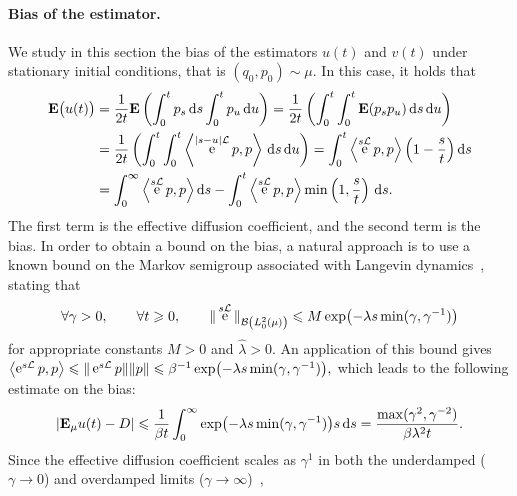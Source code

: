 \documentclass[11pt,a4paper]{article}
\DeclareMathOperator{\e}{e}
\newcommand{\expect}[0]{\mathbf{E}}
\renewcommand{\d}{\mathrm d}
\theoremstyle{plain}
\numberwithin{equation}{section}
\renewcommand{\leq}{\leqslant}
\renewcommand{\geq}{\geqslant}
\begin{document}
\paragraph{Bias of the estimator.}%
We study in this section the bias of the estimators $u(t)$ and $v(t)$ under stationary initial conditions,
that is $(q_0, p_0) \sim \mu$.
In this case, it holds that
\begin{equation}
\label{eq:bias_without_control}
\begin{aligned}
    \expect \bigl(u(t)\bigr)
    &= \frac{1}{2t} \expect \left( \int_{0}^{t} p_s \, \d s \int_{0}^{t} p_u \, \d u \right)
    = \frac{1}{2t} \left( \int_{0}^{t} \int_{0}^{t} \expect (p_s p_u) \, \d s \, \d u \right) \\
    &= \frac{1}{2t} \left( \int_{0}^{t} \int_{0}^{t} \ip{\e^{\abs{s - u} \mathcal L}p}{p} \, \d s \, \d u \right)
    =  \int_{0}^{t} \ip{\e^{s \mathcal L}p}{p} \left(1 - \frac{s}{t}\right) \d s  \\
    &= \int_{0}^{\infty} \ip{\e^{s \mathcal L}p}{p}  \d s - \int_{0}^{t} \ip{\e^{s \mathcal L}p}{p} \min\left(1, \frac{s}{t}\right) \, \d s.
\end{aligned}
\end{equation}
The first term is the effective diffusion coefficient,
and the second term is the bias.
In order to obtain a bound on the bias,
a natural approach is to use a known bound on the Markov semigroup associated with Langevin dynamics~\cite{roussel2018spectral},
stating that
\begin{equation}
    \label{eq:decay_semigroup_general}
    \forall \gamma > 0, \qquad \forall t \geq 0, \qquad
    \norm*{ \e^{s \mathcal L} }[\mathcal B \left(L^2_0\left(\mu\right) \right)] \leq M \exp \bigl(- \lambda s \min(\gamma, \gamma^{-1}) \bigr)
\end{equation}
for appropriate constants $M > 0$ and $\hat \lambda > 0$.
An application of this bound gives
\(
    \ip{\e^{s \mathcal L}p}{p} \leq \norm*{\e^{s \mathcal L}p} \norm*{p} \leq \beta^{-1} \exp\bigl(- \lambda s \min(\gamma, \gamma^{-1})\bigr),
\)
which leads to the following estimate on the bias:
\begin{equation}
    \label{eq:bias}
    \abs{\expect_{\mu} u(t) - D}
    \leq \frac{1}{\beta t}\int_{0}^{\infty} \exp\bigl(- \lambda s \min(\gamma, \gamma^{-1})\bigr) s \, \d s
    = \frac{\max (\gamma^2, \gamma^{-2})}{\beta \lambda^2 t}.
\end{equation}
Since the effective diffusion coefficient scales as $\gamma^1$ in both the underdamped ($\gamma \to 0$) and overdamped limits ($\gamma \to \infty$)~\cite{MR2394704,MR2427108},
\end{document}
